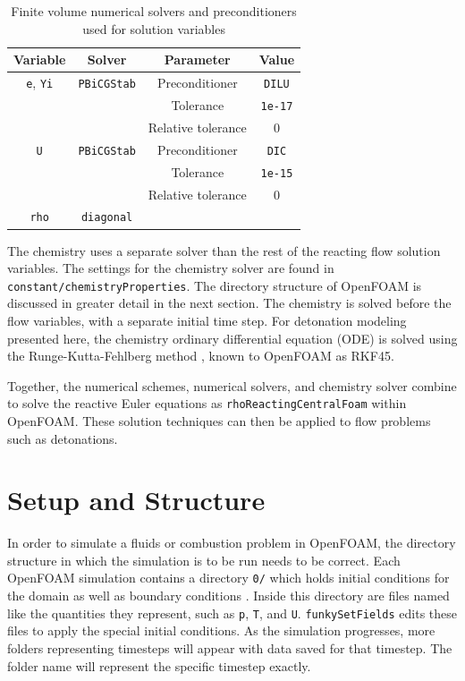 \begin{table}[t!]
\centering
\caption{Finite volume numerical solvers and preconditioners used for solution variables}
\label{tab:numerics}
\begin{tabular}{cccc}
Variable & Solver & Parameter & Value \\ \hline 
\verb|e|, \verb|Yi| & \verb|PBiCGStab| & Preconditioner & \verb|DILU| \\ 
& & Tolerance & \verb|1e-17| \\ 
& & Relative tolerance & 0 \\
\verb|U| & \verb|PBiCGStab| & Preconditioner & \verb|DIC| \\ 
& & Tolerance & \verb|1e-15| \\ 
& & Relative tolerance & 0 \\
\verb|rho| & \verb|diagonal| & & \\
\end{tabular}
\end{table}

The chemistry uses a separate solver than the rest of the reacting flow solution variables. The settings for the chemistry solver are found in \verb|constant/chemistryProperties|. The directory structure of OpenFOAM is discussed in greater detail in the next section. The chemistry is solved before the flow variables, with a separate initial time step. For detonation modeling presented here, the chemistry ordinary differential equation (ODE) is solved using the Runge-Kutta-Fehlberg method \cite{rkf}, known to OpenFOAM as RKF45. 

Together, the numerical schemes, numerical solvers, and chemistry solver combine to solve the reactive Euler equations as \verb|rhoReactingCentralFoam| within OpenFOAM. These solution techniques can then be applied to flow problems such as detonations. 

\section{Setup and Structure}
In order to simulate a fluids or combustion problem in OpenFOAM, the directory structure in which the simulation is to be run needs to be correct. Each OpenFOAM simulation contains a directory \verb|0/| which holds initial conditions for the domain as well as boundary conditions \cite{ofug}. Inside this directory are files named like the quantities they represent, such as \verb|p|, \verb|T|, and \verb|U|. \verb|funkySetFields| edits these files to apply the special initial conditions. As the simulation progresses, more folders representing timesteps will appear with data saved for that timestep. The folder name will represent the specific timestep exactly. 

